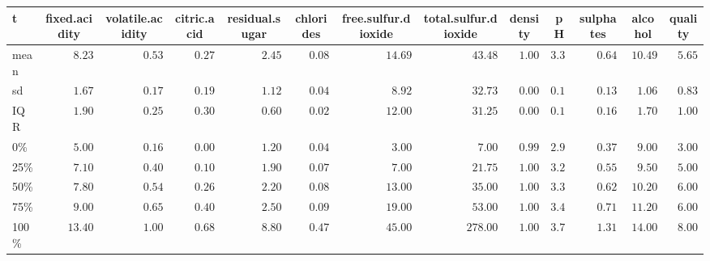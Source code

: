 \begin{table}[!tbp]
\begin{center}
\begin{tabular}{lrrrrrrrrrrrr}
\hline\hline
\multicolumn{1}{l}{t}&\multicolumn{1}{c}{fixed.acidity}&\multicolumn{1}{c}{volatile.acidity}&\multicolumn{1}{c}{citric.acid}&\multicolumn{1}{c}{residual.sugar}&\multicolumn{1}{c}{chlorides}&\multicolumn{1}{c}{free.sulfur.dioxide}&\multicolumn{1}{c}{total.sulfur.dioxide}&\multicolumn{1}{c}{density}&\multicolumn{1}{c}{pH}&\multicolumn{1}{c}{sulphates}&\multicolumn{1}{c}{alcohol}&\multicolumn{1}{c}{quality}\tabularnewline
\hline
mean&$ 8.23$&$0.53$&$0.27$&$2.45$&$0.08$&$14.69$&$ 43.48$&$1.00$&$3.31$&$0.64$&$10.49$&$5.65$\tabularnewline
sd&$ 1.67$&$0.17$&$0.19$&$1.12$&$0.04$&$ 8.92$&$ 32.73$&$0.00$&$0.14$&$0.13$&$ 1.06$&$0.83$\tabularnewline
IQR&$ 1.90$&$0.25$&$0.30$&$0.60$&$0.02$&$12.00$&$ 31.25$&$0.00$&$0.16$&$0.16$&$ 1.70$&$1.00$\tabularnewline
0\%&$ 5.00$&$0.16$&$0.00$&$1.20$&$0.04$&$ 3.00$&$  7.00$&$0.99$&$2.94$&$0.37$&$ 9.00$&$3.00$\tabularnewline
25\%&$ 7.10$&$0.40$&$0.10$&$1.90$&$0.07$&$ 7.00$&$ 21.75$&$1.00$&$3.24$&$0.55$&$ 9.50$&$5.00$\tabularnewline
50\%&$ 7.80$&$0.54$&$0.26$&$2.20$&$0.08$&$13.00$&$ 35.00$&$1.00$&$3.33$&$0.62$&$10.20$&$6.00$\tabularnewline
75\%&$ 9.00$&$0.65$&$0.40$&$2.50$&$0.09$&$19.00$&$ 53.00$&$1.00$&$3.40$&$0.71$&$11.20$&$6.00$\tabularnewline
100\%&$13.40$&$1.00$&$0.68$&$8.80$&$0.47$&$45.00$&$278.00$&$1.00$&$3.72$&$1.31$&$14.00$&$8.00$\tabularnewline
\hline
\end{tabular}\end{center}
\end{table}
